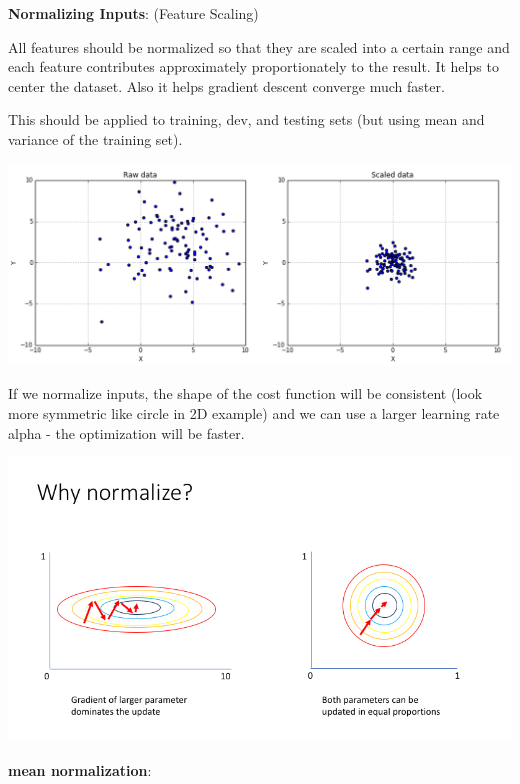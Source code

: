 \documentclass{article}
\begin{document}
\noindent \textbf{Normalizing Inputs}: (Feature Scaling)

\noindent All features should be normalized so that they are scaled into a certain range and each feature contributes approximately proportionately to the result. It helps to center the dataset. Also it helps gradient descent converge much faster.

\bigskip

\noindent This should be applied to training, dev, and testing sets (but using mean and variance of the training set).

\begin{center}
\includegraphics[scale=0.8]{./images/normalize_input.png}
\end{center}

\noindent If we normalize inputs, the shape of the cost function will be consistent (look more symmetric like circle in 2D example) and we can use a larger learning rate alpha - the optimization will be faster.

\begin{center}
\includegraphics[scale=0.4]{./images/normalize_cost.png}
\end{center}

\bigskip

\noindent \textbf{mean normalization}:
\end{document}
